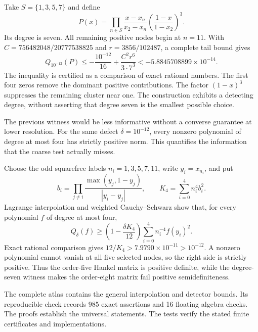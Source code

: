 Take $S=\{1,3,5,7\}$ and define
\[
P(x)=\prod_{n\in S}\frac{x-x_n}{x_2-x_n}
 \left(\frac{1-x}{1-x_2}\right)^3.
\]
Its degree is seven. All remaining positive nodes begin at $n=11$.
With
$C=756482048/20777538825$ and $r=3856/102487$, a complete tail bound gives
\[
Q_{10^{-12}}(P)\le-\frac{10^{-12}}{16}
 +\frac{C^2r^6}{3\cdot7^3}
 <-5.8845708899\times10^{-14}.
\]
The inequality is certified as a comparison of exact rational numbers.
The first four zeros remove the dominant positive contributions.
The factor $(1-x)^3$ suppresses the remaining cluster near one.
The construction exhibits a detecting degree, without asserting that degree
seven is the smallest possible choice.

The previous witness would be less informative without a converse guarantee
at lower resolution. For the same defect $\delta=10^{-12}$, every nonzero
polynomial of degree at most four has strictly positive norm. This quantifies
the information that the coarse test actually misses.


Choose the odd squarefree labels $n_i=1,3,5,7,11$, write $y_i=x_{n_i}$,
and put
\[
b_i=\prod_{j\ne i}\frac{\max(y_j,1-y_j)}{|y_i-y_j|},
\qquad K_4=\sum_{i=0}^{4}n_i^4b_i^2.
\]
Lagrange interpolation and weighted Cauchy--Schwarz show that, for every
polynomial $f$ of degree at most four,
\[
Q_\delta(f)\ge
\left(1-\frac{\delta K_4}{12}\right)
\sum_{i=0}^{4}n_i^{-4}f(y_i)^2.
\]
Exact rational comparison gives $12/K_4>7.9790\times10^{-11}>10^{-12}$.
A nonzero polynomial cannot vanish at all five selected nodes, so the right
side is strictly positive. Thus the order-five Hankel matrix is positive
definite, while the degree-seven witness makes the order-eight matrix fail
positive semidefiniteness.

The complete atlas contains the general interpolation and detector bounds.
Its reproducible check records 985 exact assertions and 16 floating algebra
checks. The proofs establish the universal statements. The tests verify the
stated finite certificates and implementations.
